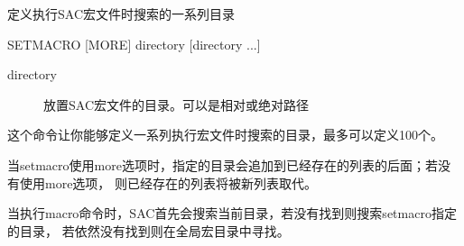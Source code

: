 \label{cmd:setmacro}

定义执行SAC宏文件时搜索的一系列目录

\begin{SACSTX}
SETMACRO  [MORE] directory [directory ...]
\end{SACSTX}

\begin{description}
\item [directory] 放置SAC宏文件的目录。可以是相对或绝对路径
\end{description}

这个命令让你能够定义一系列执行宏文件时搜索的目录，最多可以定义100个。

当setmacro使用more选项时，指定的目录会追加到已经存在的列表的后面；若没有使用more选项，
则已经存在的列表将被新列表取代。

当执行macro命令时，SAC首先会搜索当前目录，若没有找到则搜索setmacro指定的目录，
若依然没有找到则在全局宏目录中寻找。
